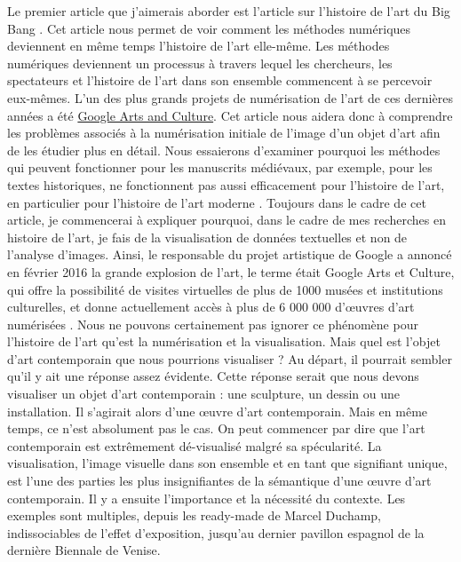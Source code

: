\documentclass[a4paper, twoside, 12pt]{book}
\begin{document}
Le premier article que j'aimerais aborder est l'article sur l'histoire de l'art du Big Bang\cite{Pifsterer, U. (2018) Big Bang Art History, International Journal for Digital Art History, no. 3 (juillet)} . Cet article nous permet de voir comment les méthodes numériques deviennent en même temps l'histoire de l'art elle-même. Les méthodes numériques deviennent un processus à travers lequel les chercheurs, les spectateurs et l'histoire de l'art dans son ensemble commencent à se percevoir eux-mêmes. L'un des plus grands projets de numérisation de l'art de ces dernières années a été \hyperlink{https://artsandculture.google.com}{Google Arts and Culture}. Cet article nous aidera donc à comprendre les problèmes associés à la numérisation initiale de l'image d'un objet d'art afin de les étudier plus en détail. Nous essaierons d'examiner pourquoi les méthodes qui peuvent fonctionner pour les manuscrits médiévaux, par exemple, pour les textes historiques, ne fonctionnent pas aussi efficacement pour l'histoire de l'art, en particulier pour l'histoire de l'art moderne . Toujours dans le cadre de cet article, je commencerai à expliquer pourquoi, dans le cadre de mes recherches en histoire de l'art, je fais de la visualisation de données textuelles et non de l'analyse d'images. Ainsi, le responsable du projet artistique de Google a annoncé en février 2016 la grande explosion de l'art, le terme était Google Arts et Culture, qui offre la possibilité de visites virtuelles de plus de 1000 musées et institutions culturelles, et donne actuellement accès à plus de 6 000 000 d'œuvres d'art numérisées\cite{Pifsterer, U. (2018) Big Bang Art History, International Journal for Digital Art History, no. 3 (juillet)} . Nous ne pouvons certainement pas ignorer ce phénomène pour l'histoire de l'art qu'est la numérisation et la visualisation. Mais quel est l'objet d'art contemporain que nous pourrions visualiser ? Au départ, il pourrait sembler qu'il y ait une réponse assez évidente. Cette réponse serait que nous devons visualiser un objet d'art contemporain : une sculpture, un dessin ou une installation. Il s'agirait alors d'une œuvre d'art contemporain. Mais en même temps, ce n'est absolument pas le cas. On peut commencer par dire que l'art contemporain est extrêmement dé-visualisé malgré sa spécularité. La visualisation, l'image visuelle dans son ensemble et en tant que signifiant unique, est l'une des parties les plus insignifiantes de la sémantique d'une œuvre d'art contemporain. Il y a ensuite l'importance et la nécessité du contexte. Les exemples sont multiples, depuis les ready-made de Marcel Duchamp, indissociables de l'effet d'exposition, jusqu'au dernier pavillon espagnol de la dernière Biennale de Venise.\\
\end{document}
